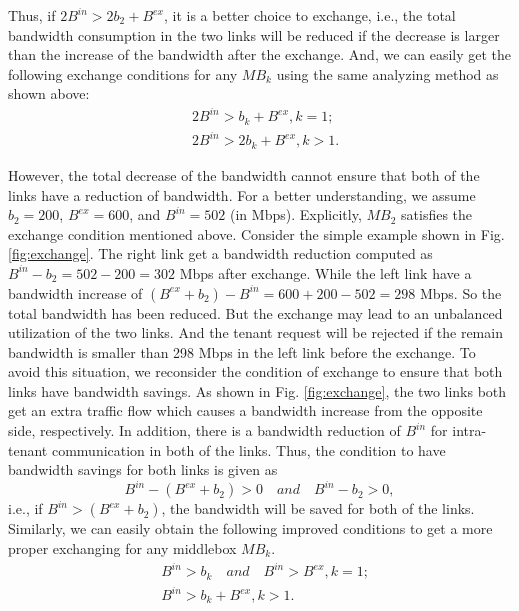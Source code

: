 \documentclass[review]{elsarticle}
\begin{document}
Thus, if $2B^{in} > 2b_2 + B^{ex}$, it is a better choice to exchange, i.e., the total bandwidth consumption in the two links will be reduced if the decrease is larger than the increase of the bandwidth after the exchange. And, we can easily get the following exchange conditions for any $MB_k$ using the same analyzing method as shown above: 
\begin{equation}
\begin{aligned}
&2B^{in}>b_k+B^{ex},k=1;\\
&2B^{in}>2b_k+B^{ex},k>1.
\end{aligned}
\end{equation}

However, the total decrease of the bandwidth cannot ensure that both of the links have a reduction of bandwidth. For a better understanding, we assume $b_2 = 200$, $B^{ex} = 600$, and $B^{in} = 502$ (in Mbps). Explicitly, $MB_2$ satisfies the exchange condition mentioned above. Consider the simple example shown in Fig. \ref{fig:exchange}. The right link get a bandwidth reduction computed as $B^{in}-b_2=502-200=302$ Mbps after exchange. While the left link have a bandwidth increase of $(B^{ex}+b_2)-B^{in}=600+200-502=298$ Mbps. So the total bandwidth has been reduced. But the exchange may lead to an unbalanced utilization of the two links. And the tenant request will be rejected if the remain bandwidth is smaller than 298 Mbps in the left link before the exchange. To avoid this situation, we reconsider the condition of exchange to ensure that both links have bandwidth savings. As shown in Fig. \ref{fig:exchange}, the two links both get an extra traffic flow which causes a bandwidth increase from the opposite side, respectively. In addition, there is a bandwidth reduction of $B^{in}$ for intra-tenant communication in both of the links. Thus, the condition to have bandwidth savings for both links is given as
\begin{equation}
B^{in}-(B^{ex}+b_2)>0 \quad and \quad B^{in}-b_2>0,
\end{equation}
i.e., if $B^{in}>(B^{ex}+b_2)$, the bandwidth will be saved for both of the links. Similarly, we can easily obtain the following improved conditions to get a more proper exchanging for any middlebox $MB_k$. 
\begin{equation}
\begin{aligned}
&B^{in}>b_k\quad and \quad B^{in}>B^{ex}, k=1;\\
&B^{in}>b_k+B^{ex}, k>1.
\end{aligned}
\label{equ:condition}
\end{equation}
\end{document}
